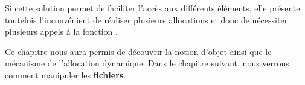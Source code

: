 Si cette solution permet de faciliter l'accès aux différents éléments,
elle présente toutefois l'inconvénient de réaliser plusieurs allocations
et donc de nécessiter plusieurs appels à la fonction .

\hrulefill

Ce chapitre nous aura permis de découvrir la notion d'objet ainsi que le
mécanisme de l'allocation dynamique. Dans le chapitre suivant, nous
verrons comment manipuler les \textbf{fichiers}.